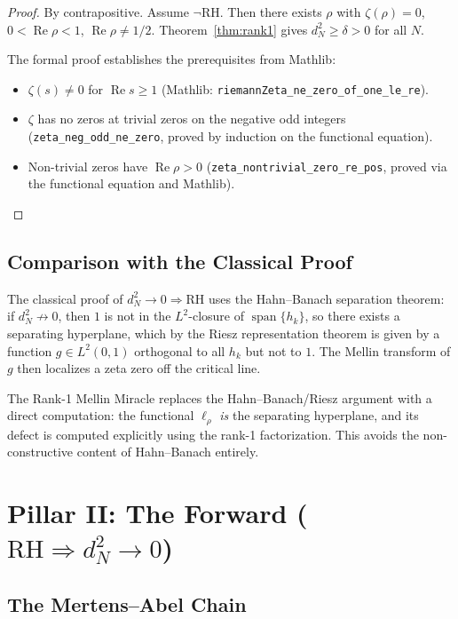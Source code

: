 \documentclass[11pt,a4paper]{article}
\theoremstyle{plain}
\theoremstyle{definition}
\theoremstyle{remark}
\newcommand{\RH}{\mathrm{RH}}
\newcommand{\re}{\operatorname{Re}}
\newcommand{\lean}[1]{\texttt{#1}}
\begin{document}
\begin{proof}
By contrapositive. Assume $\neg\RH$. Then there exists $\rho$ with
$\zeta(\rho) = 0$, $0 < \re\rho < 1$, $\re\rho \neq 1/2$.
Theorem~\ref{thm:rank1} gives $d_N^2 \geq \delta > 0$ for all $N$.

The formal proof establishes the prerequisites from Mathlib:
\begin{itemize}
  \item $\zeta(s) \neq 0$ for $\re s \geq 1$ (Mathlib:
    \lean{riemannZeta\_ne\_zero\_of\_one\_le\_re}).
  \item $\zeta$ has no zeros at trivial zeros on the negative odd integers
    (\lean{zeta\_neg\_odd\_ne\_zero}, proved by induction on the
    functional equation).
  \item Non-trivial zeros have $\re\rho > 0$ (\lean{zeta\_nontrivial\_zero\_re\_pos},
    proved via the functional equation and Mathlib).
\end{itemize}
\end{proof}

\subsection{Comparison with the Classical Proof}

The classical proof of $d_N^2 \to 0 \Rightarrow \RH$ uses the
Hahn--Banach separation theorem: if $d_N^2 \not\to 0$, then $1$
is not in the $L^2$-closure of $\operatorname{span}\{h_k\}$, so
there exists a separating hyperplane, which by the Riesz representation
theorem is given by a function $g \in L^2(0,1)$ orthogonal to all $h_k$
but not to $1$. The Mellin transform of $g$ then localizes a zeta zero
off the critical line.

The Rank-1 Mellin Miracle replaces the Hahn--Banach/Riesz argument
with a direct computation: the functional $\ell_\rho$ \emph{is} the
separating hyperplane, and its defect is computed explicitly using
the rank-1 factorization. This avoids the non-constructive content
of Hahn--Banach entirely.

\section{Pillar II: The Forward ($\RH \Rightarrow d_N^2 \to 0$)}
\label{sec:forward}

\subsection{The Mertens--Abel Chain}
\end{document}
